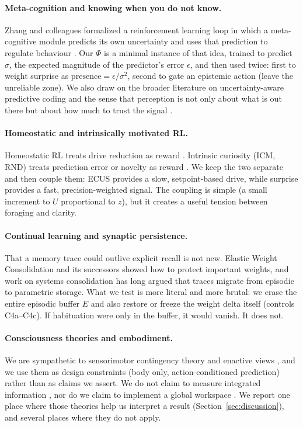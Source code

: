 \documentclass[11pt,a4paper]{article}
\begin{document}
\paragraph{Meta-cognition and knowing when you do not know.} Zhang and colleagues formalized a reinforcement learning loop in which a meta-cognitive module predicts its own uncertainty and uses that prediction to regulate behaviour \cite{zhang2026}. Our $\Phi$ is a minimal instance of that idea, trained to predict $\sigma$, the expected magnitude of the predictor's error $\epsilon$, and then used twice: first to weight surprise as $\mathrm{presence} = \epsilon / \sigma^2$, second to gate an epistemic action (leave the unreliable zone). We also draw on the broader literature on uncertainty-aware predictive coding and the sense that perception is not only about what is out there but about how much to trust the signal \cite{friston2010, laukkonen2025}.

\paragraph{Homeostatic and intrinsically motivated RL.} Homeostatic RL treats drive reduction as reward \cite{kernelan2014, man2016}. Intrinsic curiosity (ICM, RND) treats prediction error or novelty as reward \cite{pathak2017, burda2018}. We keep the two separate and then couple them: ECUS provides a slow, setpoint-based drive, while surprise provides a fast, precision-weighted signal. The coupling is simple (a small increment to $U$ proportional to $z$), but it creates a useful tension between foraging and clarity.

\paragraph{Continual learning and synaptic persistence.} That a memory trace could outlive explicit recall is not new. Elastic Weight Consolidation \cite{kirkpatrick2017} and its successors showed how to protect important weights, and work on systems consolidation has long argued that traces migrate from episodic to parametric storage. What we test is more literal and more brutal: we erase the entire episodic buffer $E$ and also restore or freeze the weight delta itself (controls C4a--C4c). If habituation were only in the buffer, it would vanish. It does not.

\paragraph{Consciousness theories and embodiment.} We are sympathetic to sensorimotor contingency theory \cite{oregan2001} and enactive views \cite{thompson2007}, and we use them as design constraints (body only, action-conditioned prediction) rather than as claims we assert. We do not claim to measure integrated information \cite{tononi2014}, nor do we claim to implement a global workspace \cite{baars1988, dehaene2011}. We report one place where those theories help us interpret a result (Section~\ref{sec:discussion}), and several places where they do not apply.
\end{document}
